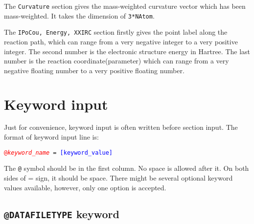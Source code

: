 The \texttt{Curvature} section gives the mass-weighted curvature vector which has been mass-weighted. It takes the dimension of \texttt{3*NAtom}.

The \texttt{IPoCou, Energy, XXIRC} section firstly gives the point label along the reaction path, which can range from a very negative integer to a very positive integer. The second number is the electronic structure energy in Hartree. The last number is the reaction coordinate(parameter) which can range from a very negative floating number to a very positive floating number.










\section{Keyword input}
Just for convenience, keyword input is often written before section input. The format of keyword input line is:

\texttt{\textcolor{red}{@\textit{keyword\_name}} = \textcolor{blue}{[keyword\_value]} }

The \texttt{@} symbol should be in the first column. No space is allowed after it. On both sides of = sign, it should be space. There might be several optional keyword values available, however, only one option is accepted.

\subsection{\texttt{@DATAFILETYPE} keyword }

